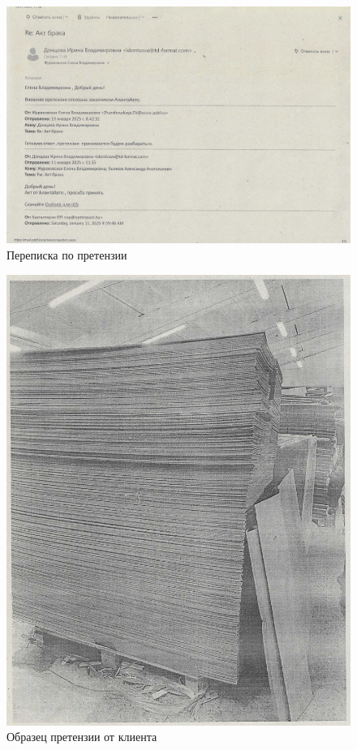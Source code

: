 \begin{figure}
\begin{center}
 \includegraphics[height=0.45\textheight, keepaspectratio]{Pics/Акт 1.jpg}
\end{center}
 \caption{Переписка по претензии}
 \label{pic:/Акт 1.}
\end{figure}

\begin{figure}
\begin{center}
 \includegraphics[height=0.9\textheight, keepaspectratio]{Pics/Акт 2.jpg}
\end{center}
 \caption{Образец претензии от клиента}
 \label{pic:/Акт 2.}
\end{figure}

